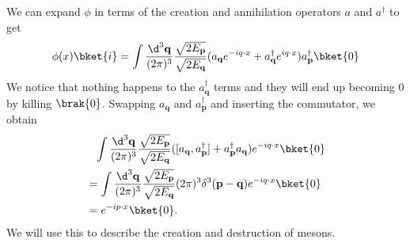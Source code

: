 \documentclass[a4paper]{article}
\begin{document}
We can expand $\phi$ in terms of the creation and annihilation operators $a$ and $a^\dagger$ to get
\[
  \phi(x) \bket{i} = \int \frac{\d^3 \mathbf{q}}{(2\pi)^3} \frac{\sqrt{2 E_\mathbf{p}}}{\sqrt{2 E_\mathbf{q}}} (a_\mathbf{q} e^{-iq\cdot x} + a_\mathbf{q}^\dagger e^{iq\cdot x}) a_\mathbf{p}^\dagger \bket{0}\\
\]
We notice that nothing happens to the $a_\mathbf{q}^\dagger$ terms and they will end up becoming $0$ by killing $\brak{0}$. Swapping $a_\mathbf{q}$ and $a_\mathbf{p}^\dagger$ and inserting the commutator, we obtain
\begin{align*}
  &\hphantom{=}\int \frac{\d^3 \mathbf{q}}{(2\pi)^3} \frac{\sqrt{2 E_\mathbf{p}}}{\sqrt{2 E_\mathbf{q}}} ([a_\mathbf{q}, a_\mathbf{p}^\dagger] + a_\mathbf{p}^\dagger a_\mathbf{q}) e^{-iq\cdot x} \bket{0}\\
  &= \int \frac{\d^3 \mathbf{q}}{(2\pi)^3} \frac{\sqrt{2 E_{\mathbf{p}}}}{\sqrt{2 E_\mathbf{q}}} (2\pi)^3 \delta^3(\mathbf{p} - \mathbf{q}) e^{-iq\cdot x} \bket{0}\\
  &= e^{-ip\cdot x}\bket{0}.
\end{align*}
We will use this to describe the creation and destruction of mesons.
\end{document}
